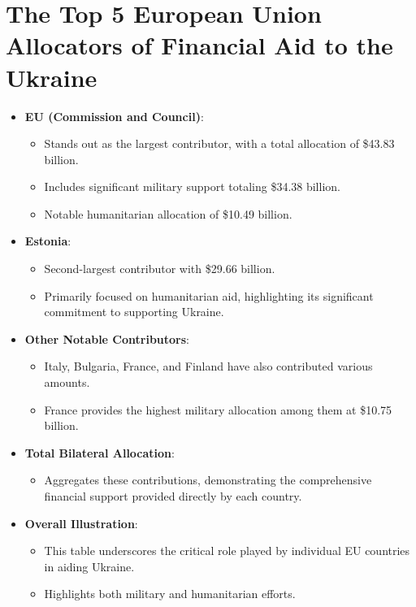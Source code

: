 \documentclass[12pt,preprint, authoryear]{elsarticle}
\numberwithin{equation}{section}
\numberwithin{figure}{section}
\numberwithin{table}{section}
\def\tightlist{} %
\begin{document}
\hypertarget{the-top-5-european-union-allocators-of-financial-aid-to-the-ukraine}{%
\section{The Top 5 European Union Allocators of Financial Aid to the
Ukraine}\label{the-top-5-european-union-allocators-of-financial-aid-to-the-ukraine}}

\begin{itemize}
\tightlist
\item
  \textbf{EU (Commission and Council)}:

  \begin{itemize}
  \tightlist
  \item
    Stands out as the largest contributor, with a total allocation of
    \$43.83 billion.
  \item
    Includes significant military support totaling \$34.38 billion.
  \item
    Notable humanitarian allocation of \$10.49 billion.
  \end{itemize}
\item
  \textbf{Estonia}:

  \begin{itemize}
  \tightlist
  \item
    Second-largest contributor with \$29.66 billion.
  \item
    Primarily focused on humanitarian aid, highlighting its significant
    commitment to supporting Ukraine.
  \end{itemize}
\item
  \textbf{Other Notable Contributors}:

  \begin{itemize}
  \tightlist
  \item
    Italy, Bulgaria, France, and Finland have also contributed various
    amounts.
  \item
    France provides the highest military allocation among them at
    \$10.75 billion.
  \end{itemize}
\item
  \textbf{Total Bilateral Allocation}:

  \begin{itemize}
  \tightlist
  \item
    Aggregates these contributions, demonstrating the comprehensive
    financial support provided directly by each country.
  \end{itemize}
\item
  \textbf{Overall Illustration}:

  \begin{itemize}
  \tightlist
  \item
    This table underscores the critical role played by individual EU
    countries in aiding Ukraine.
  \item
    Highlights both military and humanitarian efforts.
  \end{itemize}
\end{itemize}
\end{document}
